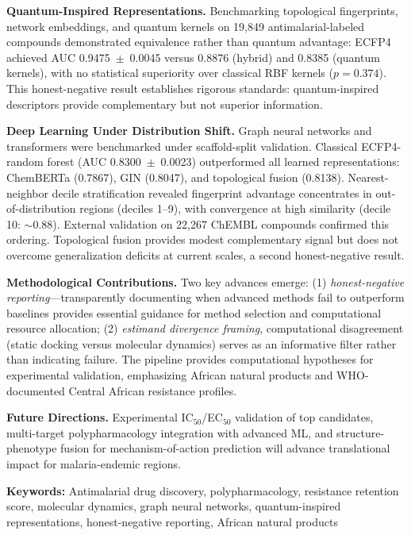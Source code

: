 \documentclass[10pt,a4paper]{article}
\begin{document}
\textbf{Quantum-Inspired Representations.} Benchmarking topological fingerprints, network embeddings, and quantum kernels on 19,849 antimalarial-labeled compounds demonstrated equivalence rather than quantum advantage: ECFP4 achieved AUC 0.9475~$\pm$~0.0045 versus 0.8876 (hybrid) and 0.8385 (quantum kernels), with no statistical superiority over classical RBF kernels ($p = 0.374$). This honest-negative result establishes rigorous standards: quantum-inspired descriptors provide complementary but not superior information.

\textbf{Deep Learning Under Distribution Shift.} Graph neural networks and transformers were benchmarked under scaffold-split validation. Classical ECFP4-random forest (AUC 0.8300~$\pm$~0.0023) outperformed all learned representations: ChemBERTa (0.7867), GIN (0.8047), and topological fusion (0.8138). Nearest-neighbor decile stratification revealed fingerprint advantage concentrates in out-of-distribution regions (deciles 1--9), with convergence at high similarity (decile 10: $\sim$0.88). External validation on 22,267 ChEMBL compounds confirmed this ordering. Topological fusion provides modest complementary signal but does not overcome generalization deficits at current scales, a second honest-negative result.

\textbf{Methodological Contributions.} Two key advances emerge: (1) \textit{honest-negative reporting}---transparently documenting when advanced methods fail to outperform baselines provides essential guidance for method selection and computational resource allocation; (2) \textit{estimand divergence framing}, computational disagreement (static docking versus molecular dynamics) serves as an informative filter rather than indicating failure. The pipeline provides computational hypotheses for experimental validation, emphasizing African natural products and WHO-documented Central African resistance profiles.

\textbf{Future Directions.} Experimental IC$_{50}$/EC$_{50}$ validation of top candidates, multi-target polypharmacology integration with advanced ML, and structure-phenotype fusion for mechanism-of-action prediction will advance translational impact for malaria-endemic regions.

\vspace{0.2cm}

{\footnotesize\textbf{Keywords:} Antimalarial drug discovery, polypharmacology, resistance retention score, molecular dynamics, graph neural networks, quantum-inspired representations, honest-negative reporting, African natural products}
\end{document}
